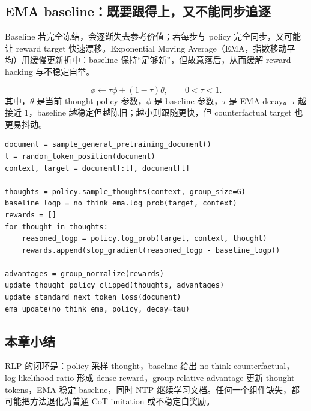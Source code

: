 \subsection{EMA baseline：既要跟得上，又不能同步追逐}

Baseline 若完全冻结，会逐渐失去参考价值；若每步与 policy 完全同步，又可能让 reward target 快速漂移。Exponential Moving Average（EMA，指数移动平均）用缓慢更新折中：baseline 保持“足够新”，但故意落后，从而缓解 reward hacking 与不稳定自举。


\[
\phi\leftarrow \tau\phi+(1-\tau)\theta,
\qquad 0<\tau<1.
\]
其中，$\theta$ 是当前 thought policy 参数，$\phi$ 是 baseline 参数，$\tau$ 是 EMA decay。$\tau$ 越接近 1，baseline 越稳定但越陈旧；越小则跟随更快，但 counterfactual target 也更易抖动。

\begin{lstlisting}[caption={RLP 单步训练的教学版伪代码}]
document = sample_general_pretraining_document()
t = random_token_position(document)
context, target = document[:t], document[t]

thoughts = policy.sample_thoughts(context, group_size=G)
baseline_logp = no_think_ema.log_prob(target, context)
rewards = []
for thought in thoughts:
    reasoned_logp = policy.log_prob(target, context, thought)
    rewards.append(stop_gradient(reasoned_logp - baseline_logp))

advantages = group_normalize(rewards)
update_thought_policy_clipped(thoughts, advantages)
update_standard_next_token_loss(document)
ema_update(no_think_ema, policy, decay=tau)
\end{lstlisting}

\subsection{本章小结}

RLP 的闭环是：policy 采样 thought，baseline 给出 no-think counterfactual，log-likelihood ratio 形成 dense reward，group-relative advantage 更新 thought tokens，EMA 稳定 baseline，同时 NTP 继续学习文档。任何一个组件缺失，都可能把方法退化为普通 CoT imitation 或不稳定自奖励。

